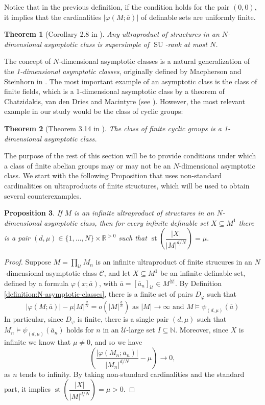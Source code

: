 \documentclass[11pt]{amsart}
\newtheorem{prop}{Proposition}[section]
\newtheorem{teor}[prop]{Theorem}
\theoremstyle{definition}
\newcommand{\bp}{\begin{prop}}
\newcommand{\ep}{\end{prop}}
\newcommand{\bdem}{\begin{proof}}
\newcommand{\edem}{\end{proof}}
\newcommand{\bt}{\begin{teor}}
\newcommand{\et}{\end{teor}}
\newcommand{\ov}[1]{\overline{#1}}
\begin{document}
Notice that in the previous definition, if the condition holds for the pair $(0,0)$, it implies that the cardinalities $|\varphi(M;\ov{a})|$ of definable sets are uniformly finite.
\bt [Corollary 2.8 in \cite{Elwes-AsymptoticClasses}] \label{SuperstabilityAsymptoticClasses} Any ultraproduct of structures in an $N$-dimensional asymptotic class is supersimple of $\operatorname{SU}$-rank at most $N$.
\et

The concept of $N$-dimensional asymptotic classes is a natural generalization of the \emph{1-dimensional asymptotic classes}, originally defined by Macpherson and Steinhorn in \cite{Macpherson-Steinhorn}. The most important example of an asymptotic class is the class of finite fields, which is a 1-dimensional asymptotic class by a theorem of Chatzidakis, van den Dries and Macintyre (see \cite{MR1162433}). However, the most relevant example in our study would be the class of cyclic groups:

\bt [Theorem 3.14 in \cite{Macpherson-Steinhorn}] The class of finite cyclic groups is a 1-dimensional asymptotic class.
\et

The purpose of the rest of this section will be to provide conditions under which a class of finite abelian groups may or may not be an $N$-dimensional asymptotic class. We start with the following Proposition that uses non-standard cardinalities on ultraproducts of finite structures, which will be used to obtain several counterexamples.

\bp \label{Proposition:N-dimensional-mu} If $M$ is an infinite ultraproduct of structures in an $N$-dimensional asymptotic class, then for every infinite definable set $X\subseteq M^1$ there is a pair $(d,\mu)\in \{1,\ldots,N\}\times \mathbb{R}^{>0}$ such that $\operatorname{st}\left(\dfrac{|X|}{|M|^{d/N}}\right)=\mu.$
\ep
\bdem Suppose $M=\prod_{\mathcal{U}}M_n$ is an infinite ultraproduct of finite strucures in an $N$-dimensional asymptotic class $\mathcal{C}$, and let $X\subseteq M^1$ be an infinite definable set, defined by a formula $\varphi(x;\ov{a})$, with $\ov{a}=[\ov{a}_n]_\mathcal{U}\in M^{|\ov{y}|}$. By Definition \ref{definition:N-asymptotic-classes}, there is a finite set of pairs $D_\varphi$ such that
\[|\varphi(M;\ov{a})|-\mu|M|^{\frac{d}{N}}=o(|M|^{\frac{d}{N}}) \text{\ \ \ as $|M|\to\infty$ and $M\models \psi_{(d,\mu)}(\ov{a})$}\]
In particular, since $D_\varphi$ is finite, there is a single pair $(d,\mu)$ such that $M_n\models \psi_{(d,\mu)}(\ov{a}_n)$ holds for $n$ in an $\mathcal{U}$-large set $I\subseteq \mathbb{N}$. Moreover, since $X$ is infinite we know that $\mu\neq 0$, and so  we have 
\[\left(\dfrac{|\varphi(M_n;\ov{a}_n)|}{|M_n|^{d/N}}-\mu\right)\to 0,\]
as $n$ tends to infinity. By taking non-standard cardinalities and the standard part, it implies $\operatorname{st}\left(\dfrac{|X|}{|M|^{d/N}}\right)=\mu>0.$
\edem
\end{document}
